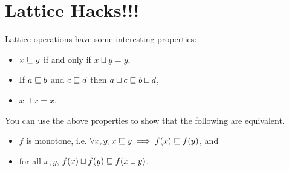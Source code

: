 \section{Lattice Hacks!!!}
Lattice operations have some interesting properties:
\begin{itemize}
\item $x \sqsubseteq{} y$ if and only if $x \sqcup y = y$,
\item If $a \sqsubseteq{} b$ and $c \sqsubseteq{} d$ then $a \sqcup c \sqsubseteq{} b \sqcup d$,
\item $x \sqcup x = x$.
\end{itemize}

You can use the above properties to show that the following are equivalent.
\begin{itemize}
\item $f$ is monotone, i.e. $\forall x,y, x \sqsubseteq y \implies f(x) \sqsubseteq f(y)$, and
\item for all $x,y$, $f(x) \sqcup f(y) \sqsubseteq{} f(x \sqcup y)$.
\end{itemize}

